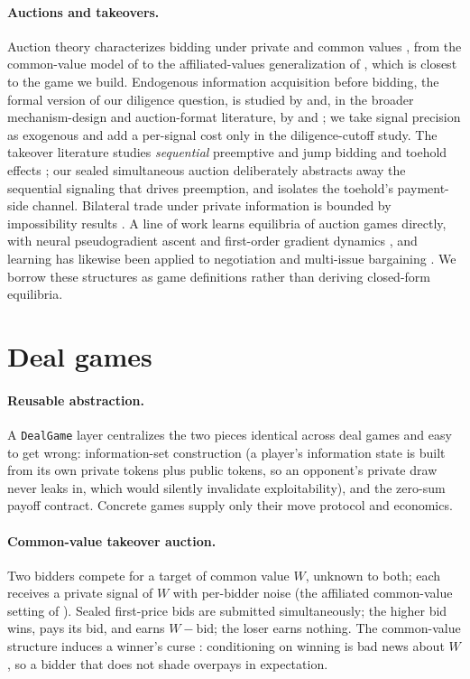 \documentclass[11pt,a4paper]{article}
\begin{document}
\paragraph{Auctions and takeovers.} Auction theory characterizes bidding under
private and common values \citep{klemperer1999}, from the common-value model of
\citet{wilson1977} to the affiliated-values generalization of \citet{milgromweber1982},
which is closest to the game we build. Endogenous information acquisition before bidding,
the formal version of our diligence question, is studied by \citet{persico2000} and,
in the broader mechanism-design and auction-format literature, by
\citet{bergemann2002} and \citet{comptejehiel2007}; we take
signal precision as exogenous and add a per-signal cost only in the diligence-cutoff
study. The takeover literature studies \emph{sequential} preemptive and jump bidding
\citep{fishman1988} and toehold effects \citep{bulow1999}; our sealed simultaneous auction
deliberately abstracts away the sequential signaling that drives preemption, and
isolates the toehold's payment-side channel. Bilateral trade under private
information is bounded by impossibility results \citep{myerson1983}. A line of work
learns equilibria of auction games directly, with neural pseudogradient ascent
\citep{npga2021} and first-order gradient dynamics \citep{kohring2023}, and learning
has likewise been applied to negotiation and
multi-issue bargaining \citep{bargaining2020}. We borrow these structures as game
definitions rather than deriving closed-form equilibria.

\section{Deal games}

\paragraph{Reusable abstraction.} A \texttt{DealGame} layer centralizes the two
pieces identical across deal games and easy to get wrong: information-set
construction (a player's information state is built from its own private tokens plus
public tokens, so an opponent's private draw never leaks in, which would silently
invalidate exploitability), and the zero-sum payoff contract. Concrete games supply
only their move protocol and economics.

\paragraph{Common-value takeover auction.} Two bidders compete for a target of
common value $W$, unknown to both; each receives a private signal of $W$ with
per-bidder noise (the affiliated common-value setting of \citealp{milgromweber1982}).
Sealed first-price bids are submitted simultaneously; the higher bid wins, pays its
bid, and earns $W-\text{bid}$; the loser earns nothing. The common-value structure
induces a winner's curse \citep{capen1971, kagellevin1986}: conditioning on winning
is bad news about $W$, so a bidder that does not shade overpays in expectation.
\end{document}
